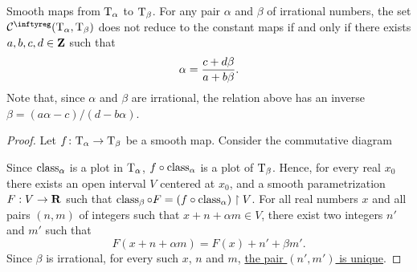 \begin{Article}{Smooth maps from $\mathrm{T}_\alpha$ to $\mathrm{T}_\beta$.}{}
  For any pair $\alpha$ and $\beta$ of irrational numbers,
  the set $\Cinfty(\Torus_\alpha,\Torus_\beta)$ does not reduce to the constant maps if and only if there exists  $a,b,c,d \in \mathbf{Z}$ such that
  $$%
    \alpha = {c + d \beta \over a + b \beta}.
    $$%
  Note that,
  since $\alpha$ and $\beta$ are irrational,
  the relation above has an inverse $\beta = (a \alpha - c) / (d - b \alpha)$.
\end{Article}

\begin{proof}
  Let $f \colon \mathrm{T}_\alpha \to \mathrm{T}_\beta$ be a smooth map.
  Consider the commutative diagram
  \begin{center}
  \end{center}
  Since $\operatorname{class}_\alpha$ is a plot in $\mathrm{T}_\alpha$,
  $f \circ \operatorname{class}_\alpha$ is a plot of $\mathrm{T}_\beta$.
  Hence,
  for every real $x_0$ there exists an open interval $V$ centered at $x_0$,
  and a smooth parametrization $F : V \to \mathbf{R}$ such that $\operatorname{class}_\beta \circ F = (f \circ \operatorname{class}_\alpha) \restriction V$.
  For all real numbers $x$ and all pairs $(n,m)$ of integers such that $x + n + \alpha m \in V$,
  there exist two integers $n'$ and $m'$ such that
  \begin{equation} \tag{$\spadesuit$}
    F(x + n + \alpha m) = F(x) + n' + \beta m'.
  \end{equation}
  Since $\beta$ is irrational, for every such $x$, $n$ and $m$,
  \uline{the pair $(n',m')$ is unique}.
  

\end{proof}
